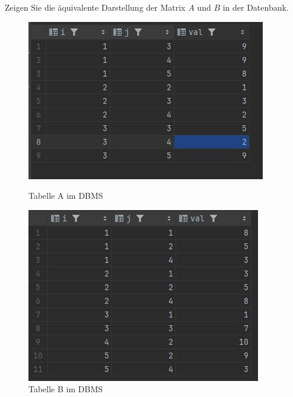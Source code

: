 \documentclass[11pt]{scrartcl}
\begin{document}
Zeigen Sie die äquivalente Darstellung der Matrix $A$ und $B$ in der Datenbank.

\begin{figure}[H]
    \begin{minipage}[b]{.4\linewidth}
        \begin{center}
            \includegraphics[width=\linewidth]{table_matrix_a.jpg}
        \end{center}
        \caption{Tabelle A im DBMS}
    \end{minipage}
    \hspace{.1\linewidth}
    \begin{minipage}[b]{.4\linewidth}
        \begin{center}
            \includegraphics[width=\linewidth]{table_matrix_b.jpg}
        \end{center}
        \caption{Tabelle B im DBMS}
    \end{minipage}
\end{figure}
\end{document}
